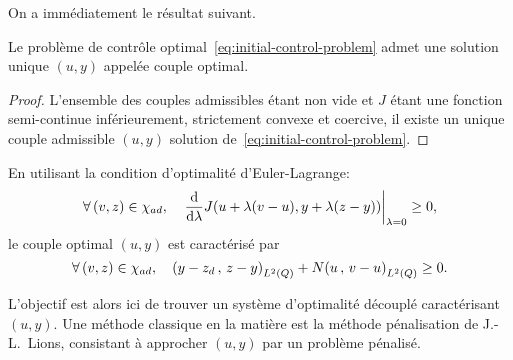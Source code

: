 On a immédiatement le résultat suivant.
\begin{theoreme}%
    Le problème de contrôle optimal~\eqref{eq:initial-control-problem}
    admet une solution unique $(u,y)$ appelée couple optimal.
\end{theoreme}

\begin{proof}%
    L'ensemble des couples admissibles étant non vide et $J$ étant une
    fonction semi-continue inférieurement, strictement convexe et coercive,
    il existe un unique couple admissible $(u,y)$ solution
    de~\eqref{eq:initial-control-problem}.
\end{proof}

\begin{remarque}%
    En utilisant la condition d'optimalité d'Euler-Lagrange:
    \begin{equation*}
        \forall\,(v,z)\in{\chi}_{ad},\quad {\left.{%
            \dfrac{\diff}{\diff{\lambda}}J\!\left({%
                u + \lambda(v - u), y + \lambda (z - y)
            }\right)
        }\right|}_{\lambda = 0} \geq 0,
    \end{equation*}
    le couple optimal $(u,y)$ est caractérisé par
    \begin{equation*}
        \forall\,(v,z)\in {\chi}_{ad},\quad {\left({ y - z_{d}\,,\,z - y }\right)}_{L^{2}\left({Q}\right)} +
        N{\left({ u\,,\,v - u }\right)}_{L^{2}\left({Q}\right)} \geq 0.
    \end{equation*}
\end{remarque}

L'objectif est alors ici de trouver un système d'optimalité découplé
caractérisant $(u,y)$. Une méthode classique en la matière est la méthode
pénalisation de J.-L.~Lions, consistant à approcher $(u,y)$ par un problème
pénalisé.
